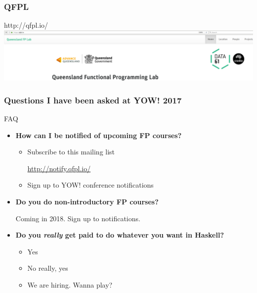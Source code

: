 \begin{frame}
\frametitle{QFPL}
\begin{block}{http://qfpl.io/}
\includegraphics[height=0.24\textheight]{image/qfpl-io.png}
\end{block}
\end{frame}

\begin{frame}
\frametitle{Questions I have been asked at YOW! 2017}
\begin{block}{FAQ}
\begin{itemize}
\item<1-> \textbf{How can I be notified of upcoming FP courses?}
  \begin{itemize}
  \item Subscribe to this mailing list

        \url{http://notify.qfpl.io/}
  \item Sign up to YOW! conference notifications
  \end{itemize}
\item<2-> \textbf{Do you do non-introductory FP courses?}

  Coming in 2018. Sign up to notifications.
\item<3-> \textbf{Do you \emph{really} get paid to do whatever you want in Haskell?}
  \begin{itemize}
  \item<3-> Yes
  \item<4-> No really, yes
  \item<5-> We are hiring. Wanna play?
  \end{itemize}
\end{itemize}
\end{block}
\end{frame}
